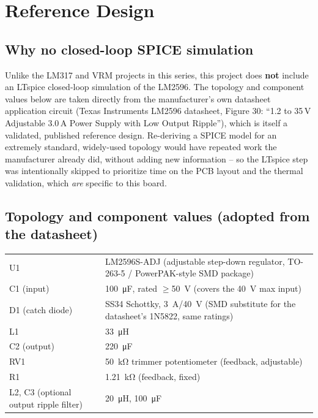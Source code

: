 \documentclass[11pt,letterpaper]{article}
\begin{document}
\section{Reference Design}
\label{sec:design}

\subsection{Why no closed-loop SPICE simulation}

Unlike the LM317 and VRM projects in this series, this project does \textbf{not} include an LTspice
closed-loop simulation of the LM2596. The topology and component values below are taken directly from the
manufacturer's own datasheet application circuit (Texas Instruments LM2596 datasheet, Figure 30: ``1.2 to
35\,V Adjustable 3.0\,A Power Supply with Low Output Ripple''), which is itself a validated, published
reference design. Re-deriving a SPICE model for an extremely standard, widely-used topology would have
repeated work the manufacturer already did, without adding new information -- so the LTspice step was
intentionally skipped to prioritize time on the PCB layout and the thermal validation, which \emph{are}
specific to this board.

\subsection{Topology and component values (adopted from the datasheet)}

\begin{center}
\begin{tabular}{@{}ll@{}}
\toprule
U1 & LM2596S-ADJ (adjustable step-down regulator, TO-263-5 / PowerPAK-style SMD package) \\
C1 (input) & \SI{100}{\micro\farad}, rated $\geq$\SI{50}{\volt} (covers the \SI{40}{\volt} max input) \\
D1 (catch diode) & SS34 Schottky, \SI{3}{\ampere}/\SI{40}{\volt} (SMD substitute for the datasheet's 1N5822, same ratings) \\
L1 & \SI{33}{\micro\henry} \\
C2 (output) & \SI{220}{\micro\farad} \\
RV1 & \SI{50}{\kilo\ohm} trimmer potentiometer (feedback, adjustable) \\
R1 & \SI{1.21}{\kilo\ohm} (feedback, fixed) \\
L2, C3 (optional output ripple filter) & \SI{20}{\micro\henry}, \SI{100}{\micro\farad} \\
\bottomrule
\end{tabular}
\end{center}
\end{document}
